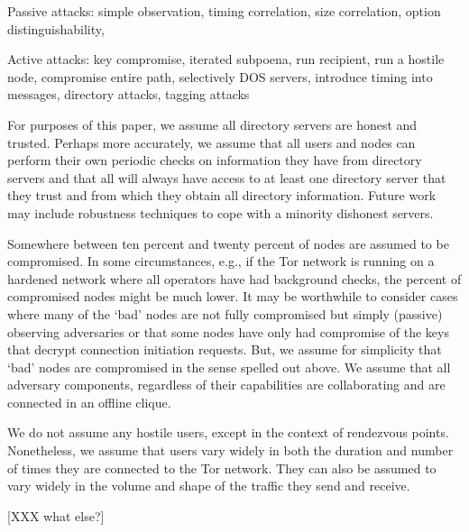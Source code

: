 \documentclass[times,10pt,twocolumn]{article}
\begin{document}
Passive attacks:
simple observation,
timing correlation,
size correlation,
option distinguishability,

Active attacks:
key compromise,
iterated subpoena,
run recipient,
run a hostile node,
compromise entire path,
selectively DOS servers,
introduce timing into messages,
directory attacks,
tagging attacks



For purposes of this paper, we assume all directory servers are honest
and trusted. Perhaps more accurately, we assume that all users and
nodes can perform their own periodic checks on information they have
from directory servers and that all will always have access to at
least one directory server that they trust and from which they obtain
all directory information. Future work may include robustness
techniques to cope with a minority dishonest servers.

Somewhere between ten percent and twenty percent of nodes are assumed
to be compromised. In some circumstances, e.g., if the Tor network is
running on a hardened network where all operators have had
background checks, the percent of compromised nodes might be much
lower. It may be worthwhile to consider cases where many of the `bad'
nodes are not fully compromised but simply (passive) observing
adversaries or that some nodes have only had compromise of the keys
that decrypt connection initiation requests. But, we assume for
simplicity that `bad' nodes are compromised in the sense spelled out
above. We assume that all adversary components, regardless of their
capabilities are collaborating and are connected in an offline clique.

We do not assume any hostile users, except in the context of
rendezvous points. Nonetheless, we assume that users vary widely in
both the duration and number of times they are connected to the Tor
network. They can also be assumed to vary widely in the volume and
shape of the traffic they send and receive.


[XXX what else?]



\label{sec:design}
\end{document}
